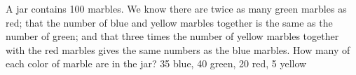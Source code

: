{A jar contains 100 marbles. We know there are twice as many green marbles as red; that the number of blue and yellow marbles together is the same as the number of green; and that three times the number of yellow marbles together with the red marbles gives the same numbers as the blue marbles. How many of each color of marble are in the jar?}
{35 blue, 40 green, 20 red, 5 yellow}